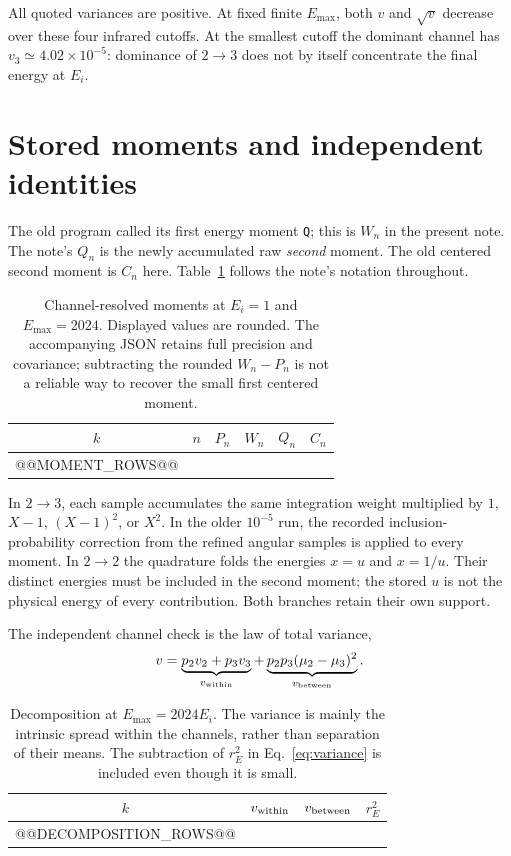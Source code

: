 \documentclass[10pt,a4paper]{article}
\begin{document}
All quoted variances are positive. At fixed finite $E_{\max}$, both $v$
and $\sqrt v$ decrease over these four infrared cutoffs. At the smallest
cutoff the dominant channel has $v_3\simeq4.02\times10^{-5}$: dominance
of $2\to3$ does not by itself concentrate the final energy at $E_i$.

\clearpage
\section{Stored moments and independent identities}
The old program called its first energy moment \texttt{Q}; this is
$W_n$ in the present note. The note's $Q_n$ is the newly accumulated raw
\emph{second} moment. The old centered second moment is $C_n$ here.
Table~\ref{tab:moments} follows the note's notation throughout.

\begin{table}[h!]
\centering\scriptsize
\caption{Channel-resolved moments at $E_i=1$ and $E_{\max}=2024$.
Displayed values are rounded. The accompanying JSON retains full
precision and covariance; subtracting the rounded $W_n-P_n$ is not a
reliable way to recover the small first centered moment.}
\label{tab:moments}
\begin{tabular}{cccccc}
\toprule
$k$ & $n$ & $P_n$ & $W_n$ & $Q_n$ & $C_n$\\
\midrule
@@MOMENT_ROWS@@
\bottomrule
\end{tabular}
\end{table}

In $2\to3$, each sample accumulates the same integration weight
multiplied by $1$, $X-1$, $(X-1)^2$, or $X^2$. In the older $10^{-5}$
run, the recorded inclusion-probability correction from the refined
angular samples is applied to every moment. In $2\to2$ the quadrature
folds the energies $x=u$ and $x=1/u$. Their distinct energies must be
included in the second moment; the stored $u$ is not the physical
energy of every contribution. Both branches retain their own support.

The independent channel check is the law of total variance,
\begin{equation}
 v=\underbrace{p_2v_2+p_3v_3}_{v_{\rm within}}+
 \underbrace{p_2p_3(\mu_2-\mu_3)^2}_{v_{\rm between}}.
\end{equation}
\begin{table}[h!]
\centering\small
\caption{Decomposition at $E_{\max}=2024E_i$. The variance is mainly
the intrinsic spread within the channels, rather than separation of
their means. The subtraction of $r_E^2$ in Eq.~\eqref{eq:variance} is
included even though it is small.}
\begin{tabular}{cccc}
\toprule
$k$ & $v_{\rm within}$ & $v_{\rm between}$ & $r_E^2$\\
\midrule
@@DECOMPOSITION_ROWS@@
\bottomrule
\end{tabular}
\end{table}
\end{document}

